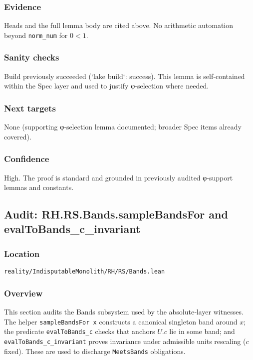 \documentclass{article}
\newcommand{\FileRef}[1]{\texttt{#1}}
\begin{document}
\subsubsection{Evidence}
Heads and the full lemma body are cited above. No arithmetic automation beyond \texttt{norm\_num} for \(0<1\).

\subsubsection{Sanity checks}
Build previously succeeded (`lake build`: success). This lemma is self‑contained within the Spec layer and used to justify φ‑selection where needed.

\subsubsection{Next targets}
None (supporting φ‑selection lemma documented; broader Spec items already covered).

\subsubsection{Confidence}
High. The proof is standard and grounded in previously audited φ‑support lemmas and constants.

\subsection{Audit: RH.RS.Bands.sampleBandsFor and evalToBands\_c\_invariant}
\subsubsection{Location}
\FileRef{reality/IndisputableMonolith/RH/RS/Bands.lean}

\subsubsection{Overview}
This section audits the Bands subsystem used by the absolute‑layer witnesses. The helper \texttt{sampleBandsFor x} constructs a canonical singleton band around \(x\); the predicate \texttt{evalToBands\_c} checks that anchors \(U.c\) lie in some band; and \texttt{evalToBands\_c\_invariant} proves invariance under admissible units rescaling (\(c\) fixed). These are used to discharge \texttt{MeetsBands} obligations.
\end{document}
